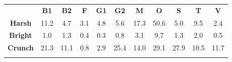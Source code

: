 \begin{tabular}{|c||c|c|c|c|c|c|c|c|c|c|}
	\cline{2-11}
	\multicolumn{1}{c|}{} & \bf{B1} & \bf{B2} & \bf{F} & \bf{G1} & \bf{G2} & \bf{M} & \bf{O} & \bf{S} & \bf{T} & \bf{V} \tabularnewline
	\hhline{~|-|-|-|-|-|-|-|-|-|-|}
	\noalign{\vspace{\doublerulesep}}
	\hhline{-||-|-|-|-|-|-|-|-|-|-|}
	\bf{Harsh} & 11.2 &  4.7 &  3.1 &  4.8 &  5.6 & 17.3 & 50.6 &  5.0 &  9.5 &  2.4 \tabularnewline
	\hhline{-||-|-|-|-|-|-|-|-|-|-|}
	\bf{Bright} & 1.0 & 1.3 & 0.4 & 0.3 & 0.8 & 3.1 & 9.7 & 1.3 & 2.0 & 0.5 \tabularnewline
	\hhline{-||-|-|-|-|-|-|-|-|-|-|}
	\bf{Crunch} & 21.3 & 11.1 &  0.8 &  2.9 & 25.4 & 14.0 & 29.1 & 27.9 & 10.5 & 11.7 \tabularnewline
	\hhline{-||-|-|-|-|-|-|-|-|-|-|}
\end{tabular}

